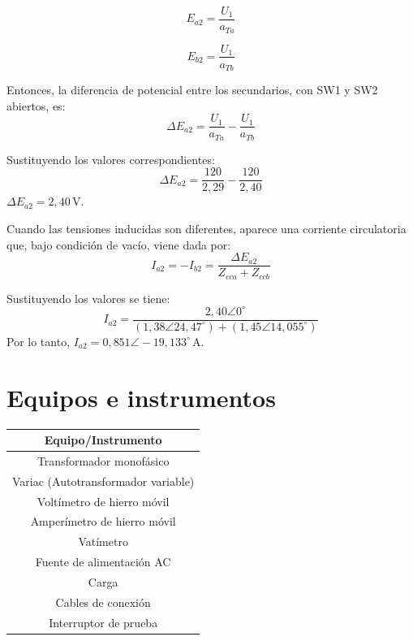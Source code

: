 \documentclass[12pt]{article}
\begin{document}
\begin{equation}
    E_{a2} = \frac{U_1}{a_{Ta}}
\end{equation}

\begin{equation}
    E_{b2} = \frac{U_1}{a_{Tb}}
\end{equation}

Entonces, la diferencia de potencial entre los secundarios, con SW1 y SW2 abiertos, es:
\begin{equation}
    \Delta E_{a2} = \frac{U_1}{a_{Ta}} - \frac{U_1}{a_{Tb}}
\end{equation}

Sustituyendo los valores correspondientes:
\[
    \Delta E_{a2} = \frac{120}{2{,}29} - \frac{120}{2{,}40} 
\]
$\Delta E_{a2} = 2{,}40\,\text{V}$.

Cuando las tensiones inducidas son diferentes, aparece una corriente circulatoria que, bajo condición de vacío, viene dada por:
\begin{equation}
    I_{a2} = -I_{b2} = \frac{\Delta E_{a2}}{Z_{cca} + Z_{ccb}}
\end{equation}

Sustituyendo los valores se tiene:
\[
    I_{a2} = \frac{2{,}40\angle 0^\circ}{(1{,}38\angle 24{,}47^\circ) + (1{,}45\angle 14{,}055^\circ)}
\]
Por lo tanto, $I_{a2} = 0{,}851\angle -19{,}133^\circ\,\text{A}$.

\newpage

\section{Equipos e instrumentos}
\begin{table}[H]
\centering
\begin{tabular}{|c|}
\hline
\textbf{Equipo/Instrumento} \\ \hline
Transformador monof\'asico \\ \hline
Variac (Autotransformador variable) \\ \hline
Volt\'imetro de hierro m\'ovil \\ \hline
Amper\'imetro de hierro m\'ovil \\ \hline
Vat\'imetro \\ \hline
Fuente de alimentaci\'on AC \\ \hline
Carga \\ \hline
Cables de conexi\'on \\ \hline
Interruptor de prueba \\ \hline
\end{tabular}
\end{table}
\end{document}
